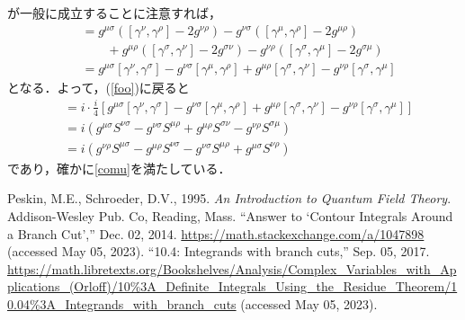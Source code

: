 \documentclass[a4paper,pdflatex,ja=standard]{bxjsarticle}
\newcommand{\gcomu}[2]{
  [\gamma^{#1},\gamma^{#2}]-2g^{#1#2}
}
\begin{document}
が一般に成立することに注意すれば，
\begin{align}
  [
  \gamma^{\nu}\gamma^{\mu}
  ,
  \gamma^{\sigma}\gamma^{\rho}
  ]
  &=
  g^{\mu\sigma}(\gcomu{\nu}{\rho})
  -
  g^{\nu\sigma}(\gcomu{\mu}{\rho})
  \nonumber
  \\
  &\qquad
  +
  g^{\mu\rho}(\gcomu{\sigma}{\nu})
  -
  g^{\nu\rho}(\gcomu{\sigma}{\mu})
  \nonumber
  \\
  &=
  g^{\mu\sigma}[\gamma^{\nu},\gamma^{\sigma}]
  -
  g^{\nu\sigma}[\gamma^{\mu},\gamma^{\rho}]
  +
  g^{\mu\rho}[\gamma^{\sigma},\gamma^{\nu}]
  -
  g^{\nu\rho}[\gamma^{\sigma},\gamma^{\mu}]
\end{align}
となる．よって，(\ref{foo})に戻ると
\begin{align}
  [S^{\mu\nu},S^{\rho\sigma}]
  &=
  i\cdot
  \frac{i}{4}
  \left[  
    g^{\mu\sigma}[\gamma^{\nu},\gamma^{\sigma}]
    -
    g^{\nu\sigma}[\gamma^{\mu},\gamma^{\rho}]
    +
    g^{\mu\rho}[\gamma^{\sigma},\gamma^{\nu}]
    -
    g^{\nu\rho}[\gamma^{\sigma},\gamma^{\mu}]
  \right]
  \nonumber
  \\
  &=
  i
  ( 
    g^{\mu\sigma}S^{\nu\sigma}
    -
    g^{\nu\sigma}S^{\mu\rho}
    +
    g^{\mu\rho}S^{\sigma\nu}
    -
    g^{\nu\rho}S^{\sigma\mu}
  )
  \nonumber
  \\
  &=
  i(
    g^{\nu\rho}S^{\mu\sigma}
    -
    g^{\mu\rho}S^{\nu\sigma}
    -
    g^{\nu\sigma}S^{\mu\rho}
    +
    g^{\mu\sigma}S^{\nu\rho}
  )
\end{align}
であり，確かに\eqref{comu}を満たしている．








\clearpage

\begin{thebibliography}{99}
   Peskin, M.E., Schroeder, D.V., 1995. \textit{An Introduction to Quantum Field Theory}. Addison-Wesley Pub. Co, Reading, Mass.
   “Answer to ‘Contour Integrals Around a Branch Cut’,” Dec. 02, 2014. \url{https://math.stackexchange.com/a/1047898} (accessed May 05, 2023).
   “10.4: Integrands with branch cuts,” Sep. 05, 2017. \url{https://math.libretexts.org/Bookshelves/Analysis/Complex_Variables_with_Applications_(Orloff)/10\%3A_Definite_Integrals_Using_the_Residue_Theorem/10.04\%3A_Integrands_with_branch_cuts} (accessed May 05, 2023).
\end{thebibliography}
\end{document}
